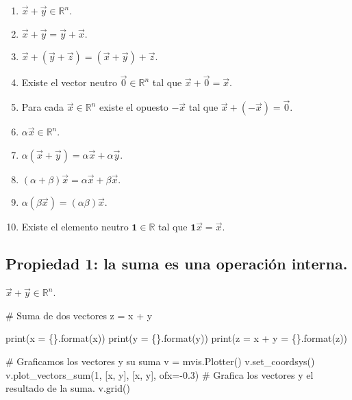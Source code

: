 \documentclass[
  letterpaper,
  DIV=11,
  numbers=noendperiod]{scrreprt}
\newenvironment{Shaded}{\begin{snugshade}}{\end{snugshade}}
\newcommand{\BuiltInTok}[1]{\textcolor[rgb]{0.00,0.23,0.31}{#1}}
\newcommand{\CommentTok}[1]{\textcolor[rgb]{0.37,0.37,0.37}{#1}}
\newcommand{\DecValTok}[1]{\textcolor[rgb]{0.68,0.00,0.00}{#1}}
\newcommand{\FloatTok}[1]{\textcolor[rgb]{0.68,0.00,0.00}{#1}}
\newcommand{\NormalTok}[1]{\textcolor[rgb]{0.00,0.23,0.31}{#1}}
\newcommand{\OperatorTok}[1]{\textcolor[rgb]{0.37,0.37,0.37}{#1}}
\newcommand{\SpecialCharTok}[1]{\textcolor[rgb]{0.37,0.37,0.37}{#1}}
\newcommand{\StringTok}[1]{\textcolor[rgb]{0.13,0.47,0.30}{#1}}
\providecommand{\tightlist}{%
  \setlength{\itemsep}{0pt}\setlength{\parskip}{0pt}}\usepackage{longtable,booktabs,array}
\begin{document}
\begin{enumerate}
\def\labelenumi{\arabic{enumi}.}
\tightlist
\item
  \(\vec{x} + \vec{y} \in \mathbb{R}^n\).
\item
  \(\vec{x} + \vec{y} = \vec{y} + \vec{x}\).
\item
  \(\vec{x} + (\vec{y} + \vec{z})= (\vec{x} + \vec{y}) + \vec{z}\).
\item
  Existe el vector neutro \(\vec{0} \in \mathbb{R}^n\) tal que
  \(\vec{x} + \vec{0} = \vec{x}\).
\item
  Para cada \(\vec{x}\in \mathbb{R}^n\) existe el opuesto \(-\vec{x}\)
  tal que \(\vec{x} + (-\vec{x}) = \vec{0}\).
\item
  \(\alpha \vec{x} \in \mathbb{R}^n\).
\item
  \(\alpha (\vec{x} + \vec{y}) = \alpha \vec{x} + \alpha \vec{y}\).
\item
  \((\alpha + \beta) \vec{x} = \alpha \vec{x} + \beta \vec{x}\).
\item
  \(\alpha (\beta \vec{x}) = (\alpha \beta) \vec{x}\).
\item
  Existe el elemento neutro \(\mathbf{1} \in \mathbb{R}\) tal que
  \(\mathbf{1} \vec{x} = \vec{x}\).
\end{enumerate}

\subsection{Propiedad 1: la suma es una operación
interna.}\label{propiedad-1-la-suma-es-una-operaciuxf3n-interna.}

\(\vec{x} + \vec{y} \in \mathbb{R}^n\).

\begin{Shaded}
\begin{Highlighting}[]
\CommentTok{\# Suma de dos vectores}
\NormalTok{z }\OperatorTok{=}\NormalTok{ x }\OperatorTok{+}\NormalTok{ y}

\BuiltInTok{print}\NormalTok{(}\StringTok{\textquotesingle{}x = }\SpecialCharTok{\{\}}\StringTok{\textquotesingle{}}\NormalTok{.}\BuiltInTok{format}\NormalTok{(x))}
\BuiltInTok{print}\NormalTok{(}\StringTok{\textquotesingle{}y = }\SpecialCharTok{\{\}}\StringTok{\textquotesingle{}}\NormalTok{.}\BuiltInTok{format}\NormalTok{(y))}
\BuiltInTok{print}\NormalTok{(}\StringTok{\textquotesingle{}z = x + y = }\SpecialCharTok{\{\}}\StringTok{\textquotesingle{}}\NormalTok{.}\BuiltInTok{format}\NormalTok{(z))}

\CommentTok{\# Graficamos los vectores y su suma}
\NormalTok{v }\OperatorTok{=}\NormalTok{ mvis.Plotter()}
\NormalTok{v.set\_coordsys()}
\NormalTok{v.plot\_vectors\_sum(}\DecValTok{1}\NormalTok{, [x, y], [}\StringTok{\textquotesingle{}x\textquotesingle{}}\NormalTok{, }\StringTok{\textquotesingle{}y\textquotesingle{}}\NormalTok{], ofx}\OperatorTok{={-}}\FloatTok{0.3}\NormalTok{) }\CommentTok{\# Grafica los vectores y el resultado de la suma.}
\NormalTok{v.grid()}
\end{Highlighting}
\end{Shaded}
\end{document}
